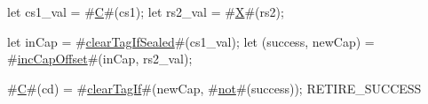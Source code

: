 let cs1_val = #\hyperref[sailRISCVzC]{C}#(cs1);
let rs2_val = #\hyperref[sailRISCVzX]{X}#(rs2);

let inCap = #\hyperref[sailRISCVzclearTagIfSealed]{clearTagIfSealed}#(cs1_val);
let (success, newCap) = #\hyperref[sailRISCVzincCapOffset]{incCapOffset}#(inCap, rs2_val);

#\hyperref[sailRISCVzC]{C}#(cd) = #\hyperref[sailRISCVzclearTagIf]{clearTagIf}#(newCap, #\hyperref[sailRISCVznot]{not}#(success));
RETIRE_SUCCESS
